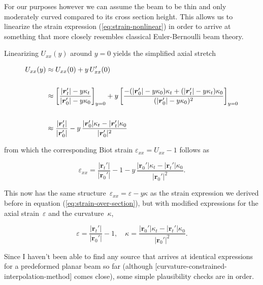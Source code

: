 For our purposes however we can assume the beam to be thin and only moderately curved compared to its cross section height.
This allows us to linearize the strain expression (\ref{eq:strain-nonlinear}) in order to arrive at something that more closely resembles classical Euler-Bernoulli beam theory.

Linearizing $U_{xx}(y)$ around $y = 0$ yields the simplified axial stretch

\begin{align}
U_{xx}(y) &\approx U_{xx}(0) + y\,U_{xx}'(0) \notag \\
\notag \\
&\approx \left[\frac{|\boldsymbol{r}_{t}'| - y\kappa_{t}}{|\boldsymbol{r}_{0}'| - y\kappa_{0}}\right]_{y=0} + y\left[\frac{-(|\boldsymbol{r}_{0}'| - y\kappa_{0})\kappa_{t} + (|\boldsymbol{r}_{t}'| - y\kappa_{t})\kappa_{0}}{(|\boldsymbol{r}_{0}'| - y\kappa_{0})^2}\right]_{y=0} \notag \\
\notag \\
&\approx \frac{|\boldsymbol{r}_{t}'|}{|\boldsymbol{r}_{0}'|} - y\,\frac{|\boldsymbol{r}_{0}'|\kappa_{t} - |\boldsymbol{r}_{t}'|\kappa_{0}}{|\boldsymbol{r}_{0}'|^2}
\end{align}

from which the corresponding Biot strain $\varepsilon_{xx} = U_{xx} - 1$ follows as

\begin{equation}
\varepsilon_{xx} = \frac{|\boldsymbol{r}_{t}'|}{|\boldsymbol{r}_{0}'|} - 1 - y\,\frac{|\boldsymbol{r}_{0}'|\kappa_{t} - |\boldsymbol{r}_{t}'|\kappa_{0}}{|\boldsymbol{r}_{0}'|^2}. \label{eq:axial-strain-predeformed}
\end{equation}

This now has the same structure~$\varepsilon_{xx} = \varepsilon - y\kappa$ as the strain expression we derived before in equation (\ref{eq:strain-over-section}), but with modified expressions for the axial strain~$\varepsilon$ and the curvature~$\kappa$,

\begin{equation}
\varepsilon = \frac{|\boldsymbol{r}_{t}'|}{|\boldsymbol{r}_{0}'|} - 1, \quad \kappa = \frac{|\boldsymbol{r}_{0}'|\kappa_{t} - |\boldsymbol{r}_{t}'|\kappa_{0}}{|\boldsymbol{r}_{0}'|^2}.
\end{equation}

Since I haven't been able to find any source that arrives at identical expressions for a predeformed planar beam so far (although [curvature-constrained-interpolation-method] comes close), some simple plausibility checks are in order.

